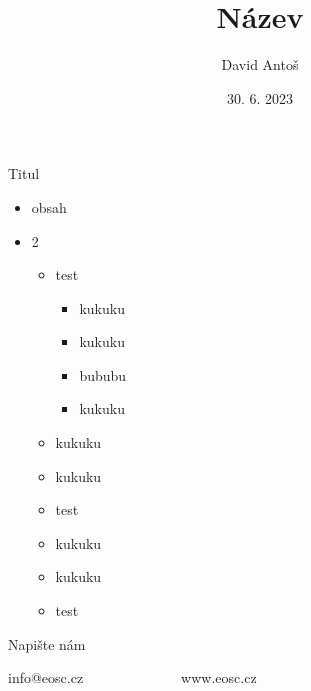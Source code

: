 \documentclass[aspectratio=169]{beamer}
\begin{document}
\title{Název}
\author[D.A.]{David Antoš}
\date{30. 6. 2023}

\begin{frame}[plain]
  \maketitle
\end{frame}

\begin{frame}{Titul}
  \begin{itemize}
    \item obsah
    \item 2
      \begin{itemize}
        \item test
          \begin{itemize}
            \item kukuku
            \item kukuku
            \item bububu
            \item kukuku
          \end{itemize}
        \item kukuku
        \item kukuku
        \item test
        \item kukuku
        \item kukuku
        \item test
      \end{itemize}
  \end{itemize}
\end{frame}

\begin{lastframe}{}
  \vspace*{.35\textheight}\par %
  Napište nám
  \par\null\par
  info@eosc.cz\ \ \ \ \ \ \ \ \ \ \ \ \ \ www.eosc.cz
  \iffalse
  \vbox to \textheight{
    \vfill
    \hbox to \textwidth{
    \hfill
  \small author contact
\kern3pt
}
}
\fi
\end{lastframe}
\end{document}
